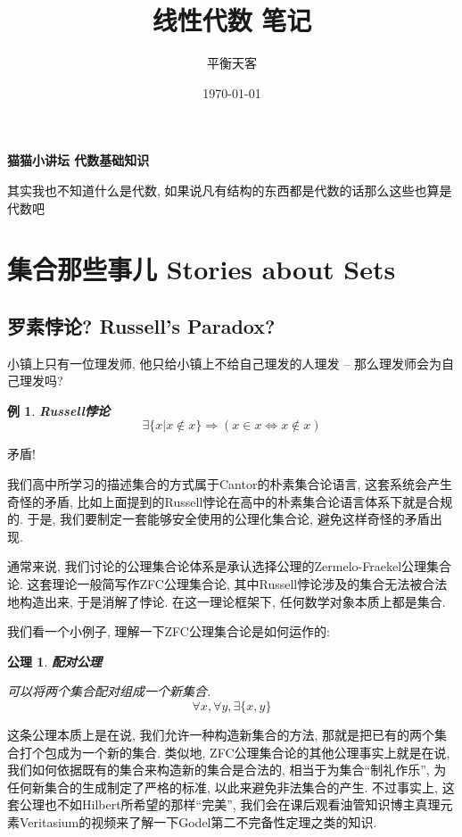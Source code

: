 \documentclass[UTF8]{ctexart}
\title{线性代数 笔记}
\author{平衡天客}
\date{\today}
\newcommand{\<}{\langle}
\renewcommand{\>}{\rangle}
\newtheorem{xmp}{例}[subsection]
\newtheorem{axm}{公理}
\begin{document}
    
    \begin{center}
        {\Large\textbf{猫猫小讲坛 代数基础知识}}

        {\scriptsize 其实我也不知道什么是代数, 如果说凡有结构的东西都是代数的话那么这些也算是代数吧}
    \end{center}

    \tableofcontents

    \section{集合那些事儿 Stories about Sets}

        \subsection{罗素悖论? Russell's Paradox? }

            小镇上只有一位理发师, 他只给小镇上不给自己理发的人理发 -- 那么理发师会为自己理发吗? 

            \begin{xmp}
                \textbf{Russell悖论}
                \[\exists\{x|x\notin x\}\Longrightarrow(x\in x\iff x\notin x)\]
            \end{xmp}

            矛盾! 

            我们高中所学习的描述集合的方式属于Cantor的朴素集合论语言, 这套系统会产生奇怪的矛盾, 比如上面提到的Russell悖论在高中的朴素集合论语言体系下就是合规的. 于是, 我们要制定一套能够安全使用的公理化集合论, 避免这样奇怪的矛盾出现. 

            通常来说, 我们讨论的公理集合论体系是承认选择公理的Zermelo-Fraekel公理集合论. 这套理论一般简写作ZFC公理集合论, 其中Russell悖论涉及的集合无法被合法地构造出来, 于是消解了悖论. 在这一理论框架下, 任何数学对象本质上都是集合. 

            我们看一个小例子, 理解一下ZFC公理集合论是如何运作的: 
    
            \begin{axm}
                \textbf{配对公理}

                可以将两个集合配对组成一个新集合. 
                \[\forall x,\forall y, \exists\{x,y\}\]
            \end{axm}

            这条公理本质上是在说, 我们允许一种构造新集合的方法, 那就是把已有的两个集合打个包成为一个新的集合. 类似地, ZFC公理集合论的其他公理事实上就是在说, 我们如何依据既有的集合来构造新的集合是合法的, 相当于为集合``制礼作乐'', 为任何新集合的生成制定了严格的标准, 以此来避免非法集合的产生. 不过事实上, 这套公理也不如Hilbert所希望的那样``完美'', 我们会在课后观看油管知识博主真理元素Veritasium的视频来了解一下Godel第二不完备性定理之类的知识. 
\end{document}
